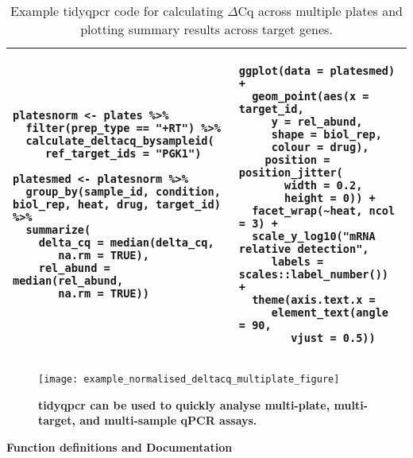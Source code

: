 \documentclass[../main.tex]{subfiles}
\begin{document}
\begin{table}
\centering
\begin{tabular}{| p{5.6cm}  p{5.6cm} |}
\hline
 \begin{lstlisting}[firstnumber=70, style=mystyle]
 platesnorm <- plates %>%
  filter(prep_type == "+RT") %>%
  calculate_deltacq_bysampleid(
     ref_target_ids = "PGK1")

platesmed <- platesnorm %>%
  group_by(sample_id, condition, biol_rep, heat, drug, target_id) %>%
  summarize(
    delta_cq = median(delta_cq,
       na.rm = TRUE),
    rel_abund = median(rel_abund,
       na.rm = TRUE))
 \end{lstlisting}& 
 \begin{lstlisting}[firstnumber=83, style=mystyle]
ggplot(data = platesmed) +
  geom_point(aes(x = target_id,
     y = rel_abund, 
     shape = biol_rep,
     colour = drug),
    position = position_jitter(
       width = 0.2,
       height = 0)) +
  facet_wrap(~heat, ncol = 3) +
  scale_y_log10("mRNA relative detection",
     labels = scales::label_number()) +
  theme(axis.text.x = 
     element_text(angle = 90,
        vjust = 0.5))
\end{lstlisting}   \\
\hline
\end{tabular}
\caption{Example tidyqpcr code for calculating $\Delta$Cq across multiple plates and plotting summary results across target genes.}
\label{calc-delta-cq}
\end{table}

\begin{figure}[t]

{\centering \texttt{[image: example\_normalised\_deltacq\_multiplate\_figure]}}

\caption[tidyqpcr can be used to quickly analyse multi-plate, multi-target, and multi-sample qPCR assays.]{\textbf{tidyqpcr can be used to quickly analyse multi-plate, multi-target, and multi-sample qPCR assays. }}\label{fig:tidyqpcr-multi-plate}
\end{figure}

\textbf{Function definitions and Documentation}
\end{document}
